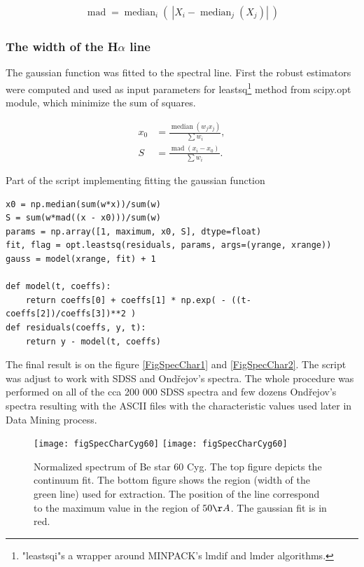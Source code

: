 \begin{align}
  \operatorname{mad} = \operatorname{median}_{i}\left(\ \left| X_{i} -
      \operatorname{median}_{j} (X_{j}) \right|\ \right)
\end{align}

\subsubsection{The width of the H$\alpha$ line}
The gaussian function was fitted to the spectral line. First the
robust estimators were computed and used as input parameters for
leastsq\footnote{"leastsqi"s a wrapper around MINPACK’s lmdif and
  lmder algorithms.} method from scipy.opt module, which minimize the
sum of squares.

\begin{align}
  x_0 & = \frac{\operatorname{median}(w_jx_j)}{\sum{w_i}}, \\
  S & = \frac{\operatorname{mad}(x_i - x_0)}{\sum{w_i}}.
\end{align}

Part of the script implementing fitting the gaussian function

\begin{lstlisting}
x0 = np.median(sum(w*x))/sum(w)
S = sum(w*mad((x - x0)))/sum(w)
params = np.array([1, maximum, x0, S], dtype=float)
fit, flag = opt.leastsq(residuals, params, args=(yrange, xrange))
gauss = model(xrange, fit) + 1

def model(t, coeffs):
    return coeffs[0] + coeffs[1] * np.exp( - ((t-coeffs[2])/coeffs[3])**2 )
def residuals(coeffs, y, t):
    return y - model(t, coeffs)
\end{lstlisting}

The final result is on the figure \ref{FigSpecChar1} and
\ref{FigSpecChar2}. The script was adjust to work with SDSS and
Ondřejov's spectra. The whole procedure was performed on all of the
cca 200 000 SDSS spectra and few dozens Ondřejov's spectra resulting
with the ASCII files with the characteristic values used later in Data
Mining process.

   \begin{figure}[!htbp]
      \begin{center}
        \leavevmode
        \ifpdf
        \texttt{[image: figSpecCharCyg60]}
        \else
        \texttt{[image: figSpecCharCyg60]}
        \fi
        \caption{Normalized spectrum of Be star 60 Cyg. The top figure
          depicts the continuum fit. The bottom figure shows the
          region (width of the green line) used for extraction. The
          position of the line correspond to the maximum value in the
          region of $50\AA$. The gaussian fit is in red.}
        \label{FigSpecChar}
      \end{center}
    \end{figure}

